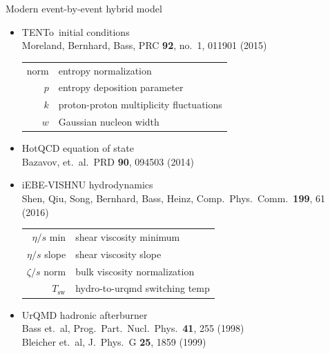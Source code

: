 \documentclass[xcolor=dvipsnames]{beamer}
\newcommand{\trento}{T\raisebox{-0.3ex}{R}ENTo}
\begin{document}
\begin{frame}{Modern event-by-event hybrid model}
    \bigskip
    \begin{itemize}
        \item \trento\ initial conditions \\
        {\scriptsize Moreland, Bernhard, Bass, PRC {\bf 92}, 
         no.\ 1, 011901 (2015)} \\
        \begin{table}
            \scriptsize \flushleft
            \begin{tabular}{r l}
                norm & entropy normalization \\ 
                $p$ & entropy deposition parameter \\
                $k$ & proton-proton multiplicity fluctuations \\
                $w$ & Gaussian nucleon width
            \end{tabular}
        \end{table}
        \medskip
        \item HotQCD equation of state \\
        {\scriptsize Bazavov, et.\ al.\ PRD {\bf 90}, 
         094503 (2014)} \\
        \smallskip 
        \item iEBE-VISHNU hydrodynamics \\
        {\scriptsize Shen, Qiu, Song, Bernhard, Bass, Heinz, 
         Comp.\ Phys.\ Comm.\ {\bf 199}, 61 (2016)}  
        \begin{table}
            \scriptsize \flushleft
            \begin{tabular}{r l}
                $\eta/s$ min & shear viscosity minimum \\ 
                $\eta/s$ slope & shear viscosity slope \\
                $\zeta/s$ norm & bulk viscosity normalization \\
                $T_\text{sw}$ & hydro-to-urqmd switching temp
            \end{tabular}
        \end{table}
        \medskip
        \item UrQMD hadronic afterburner \\
        {\scriptsize Bass et.\ al, Prog.\ Part.\ Nucl.\ Phys.\ 
         {\bf 41}, 255 (1998)} \\
        {\scriptsize Bleicher et.\ al, J.\ Phys.\ G {\bf 25}, 
         1859 (1999)}
    \end{itemize}
\end{frame}
\end{document}
